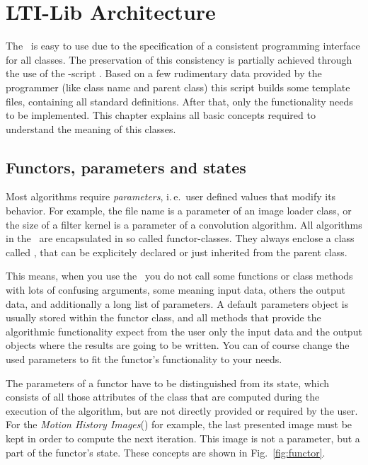 \chapter{LTI-Lib Architecture}
\label{chap:architecture}

The \ltilib\ is easy to use due to the specification of a consistent
programming interface for all classes.  The preservation of this consistency
is partially achieved through the use of the -script
.  Based on a few rudimentary data provided by the
programmer (like class name and parent class) this script builds some template
files, containing all standard definitions.  After that, only the
functionality needs to be implemented.  This chapter explains all basic
concepts required to understand the meaning of this classes.

\section{Functors, parameters and states}

Most algorithms require \emph{parameters}, i.\,e.\ user defined values that
modify its behavior.  For example, the file name is a parameter of an image
loader class, or the size of a filter kernel is a parameter of a convolution
algorithm.
%
All algorithms in the \ltilib\ are encapsulated in so called 
functor-classes.  They always enclose a class called , that
can be explicitely declared or just inherited from the parent class.

This means, when you use the \ltilib\ you do not call some functions or class
methods with lots of confusing arguments, some meaning input data, others the
output data, and additionally a long list of parameters.  A default parameters
object is usually stored within the functor class, and all methods that provide
the algorithmic functionality expect from the user only the input data and the
output objects where the results are going to be written.  You can of course
change the used parameters to fit the functor's functionality to your needs.

The parameters of a functor have to be distinguished from its state, which
consists of all those attributes of the class that are computed during the
execution of the algorithm, but are not directly provided or required by the
user.  For the \emph{Motion History Images}() for
example, the last presented image must be kept in order to compute the next
iteration.  This image is not a parameter, but a part of the functor's state.
These concepts are shown in Fig.~\ref{fig:functor}.

